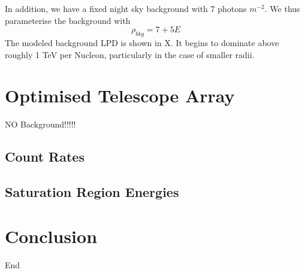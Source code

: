 \documentclass{article}
\begin{document}
In addition, we have a fixed night sky background with 7 photons $m^{-2}$. We thus parameterise the background with 
\[ \rho_{bkg}  = 7 + 5E\]
The modeled background LPD is shown in X. It begins to dominate above roughly 1 TeV per Nucleon, particularly in the case of smaller radii.

\section{Optimised Telescope Array}
NO Background!!!!!
\subsection{Count Rates}

\subsection{Saturation Region Energies}



\section{Conclusion}
End


\end{document}
